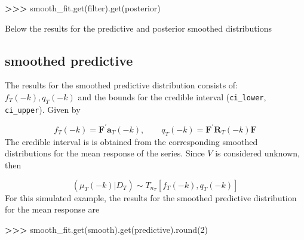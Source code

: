 \documentclass[
]{article}
\newenvironment{Shaded}{\begin{snugshade}}{\end{snugshade}}
\newcommand{\BuiltInTok}[1]{#1}
\newcommand{\DecValTok}[1]{\textcolor[rgb]{0.00,0.00,0.81}{#1}}
\newcommand{\NormalTok}[1]{#1}
\newcommand{\OperatorTok}[1]{\textcolor[rgb]{0.81,0.36,0.00}{\textbf{#1}}}
\newcommand{\StringTok}[1]{\textcolor[rgb]{0.31,0.60,0.02}{#1}}
\begin{document}
\begin{Shaded}
\begin{Highlighting}[]
\OperatorTok{\textgreater{}\textgreater{}\textgreater{}}\NormalTok{ smooth\_fit.get(}\StringTok{\textquotesingle{}filter\textquotesingle{}}\NormalTok{).get(}\StringTok{\textquotesingle{}posterior\textquotesingle{}}\NormalTok{)}
\end{Highlighting}
\end{Shaded}

Below the results for the predictive and posterior smoothed
distributions

\hypertarget{smoothed-predictive}{%
\subsection{smoothed predictive}\label{smoothed-predictive}}

The results for the smoothed predictive distribution consists of:
\(f_T(-k), q_T(-k)\) and the bounds for the credible interval
(\texttt{ci\_lower}, \texttt{ci\_upper}). Given by

\[
f_T(-k) = \mathbf{F}^{'} \mathbf{a}_T(-k), \quad \quad q_T(-k) = \mathbf{F}^{'} \mathbf{R}_T(-k) \mathbf{F}
\] The credible interval is is obtained from the corresponding smoothed
distributions for the mean response of the series. Since \(V\) is
considered unknown, then

\[
(\mu_T(-k) \vert D_T) \sim T_{n_T}[f_T(-k), q_T(-k)]
\] For this simulated example, the results for the smoothed predictive
distribution for the mean response are

\begin{Shaded}
\begin{Highlighting}[]
\OperatorTok{\textgreater{}\textgreater{}\textgreater{}}\NormalTok{ smooth\_fit.get(}\StringTok{\textquotesingle{}smooth\textquotesingle{}}\NormalTok{).get(}\StringTok{\textquotesingle{}predictive\textquotesingle{}}\NormalTok{).}\BuiltInTok{round}\NormalTok{(}\DecValTok{2}\NormalTok{)}
\end{Highlighting}
\end{Shaded}
\end{document}
